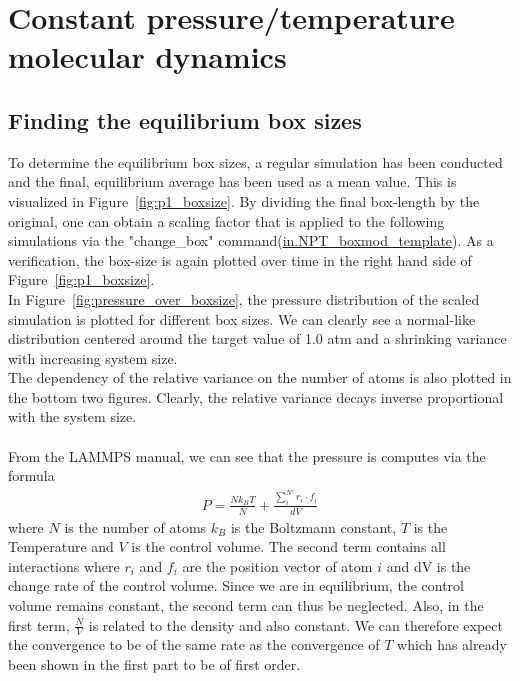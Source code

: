 \documentclass[10pt,a4paper]{report}
\def \pathpartone {../../1_three-dimensional_atomic_system}
\begin{document}
\section{Constant pressure/temperature molecular dynamics}
\subsection{Finding the equilibrium box sizes}
To determine the equilibrium box sizes, a regular simulation has been conducted and the final, equilibrium average has been used as a mean value. This is visualized in Figure~\ref{fig:p1_boxsize}. By dividing the final box-length by the original, one can obtain a scaling factor that is applied to the following simulations via the "change\_box" command(\href{\pathpartone/in.NPT_boxmod_template}{in.NPT\_boxmod\_template}).
As a verification, the box-size is again plotted over time in the right hand side of Figure~\ref{fig:p1_boxsize}.\\

In Figure~\ref{fig:pressure_over_boxsize}, the pressure distribution of the scaled simulation is plotted for different box sizes. We can clearly see a normal-like distribution centered around the target value of 1.0 atm and a shrinking variance with increasing system size.\\
The dependency of the relative variance on the number of atoms is also plotted in the bottom two figures. Clearly, the relative variance decays inverse proportional with the system size.\\
 \\
From the LAMMPS manual, we can see that the pressure is computes via the formula
\begin{align}
P=\frac{N k_B T}{N}+\frac{\sum_i^{N'}r_i\cdot f_i}{dV}
\end{align}
where $N$ is the number of atoms $k_B$ is the Boltzmann constant, $T$ is the Temperature and $V$ is the control volume. The second term contains all interactions where $r_i$ and $f_i$ are the position vector of atom $i$ and dV is the change rate of the control volume. Since we are in equilibrium, the control volume remains constant, the second term can thus be neglected. Also, in the first term, $\frac{N}{V}$ is related to the density and also constant. We can therefore expect the convergence to be of the same rate as the convergence of $T$ which has already been shown in the first part to be of first order.
\end{document}
